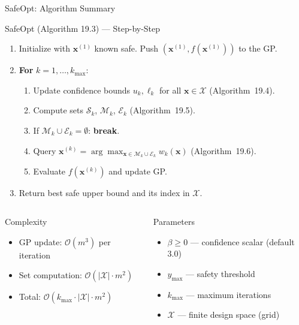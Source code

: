\documentclass[aspectratio=169,10pt]{beamer}
\begin{document}
\begin{frame}{SafeOpt: Algorithm Summary}
  \begin{block}{SafeOpt (Algorithm 19.3) — Step-by-Step}
    \begin{enumerate}
      \item Initialize with $\mathbf{x}^{(1)}$ known safe.
            Push $(\mathbf{x}^{(1)}, f(\mathbf{x}^{(1)}))$ to the GP.
      \item \textbf{For} $k = 1, \ldots, k_{\max}$:
        \begin{enumerate}
          \item Update confidence bounds $u_k, \ell_k$ for all $\mathbf{x} \in \mathcal{X}$
                (Algorithm~19.4).
          \item Compute sets $\mathcal{S}_k$, $\mathcal{M}_k$, $\mathcal{E}_k$
                (Algorithm~19.5).
          \item If $\mathcal{M}_k \cup \mathcal{E}_k = \emptyset$: \textbf{break}.
          \item Query $\mathbf{x}^{(k)} = \arg\max_{\mathbf{x}\in\mathcal{M}_k\cup\mathcal{E}_k} w_k(\mathbf{x})$
                (Algorithm~19.6).
          \item Evaluate $f(\mathbf{x}^{(k)})$ and update GP.
        \end{enumerate}
      \item Return best safe upper bound and its index in $\mathcal{X}$.
    \end{enumerate}
  \end{block}
  \begin{columns}[T]
      \begin{block}{Complexity}
        \begin{itemize}
          \item GP update: $\mathcal{O}(m^3)$ per iteration
          \item Set computation: $\mathcal{O}(|\mathcal{X}| \cdot m^2)$
          \item Total: $\mathcal{O}(k_{\max} \cdot |\mathcal{X}| \cdot m^2)$
        \end{itemize}
      \end{block}
      \begin{block}{Parameters}
        \begin{itemize}
          \item $\beta \geq 0$ — confidence scalar (default 3.0)
          \item $y_{\max}$ — safety threshold
          \item $k_{\max}$ — maximum iterations
          \item $\mathcal{X}$ — finite design space (grid)
        \end{itemize}
      \end{block}
  \end{columns}
\end{frame}
\end{document}
